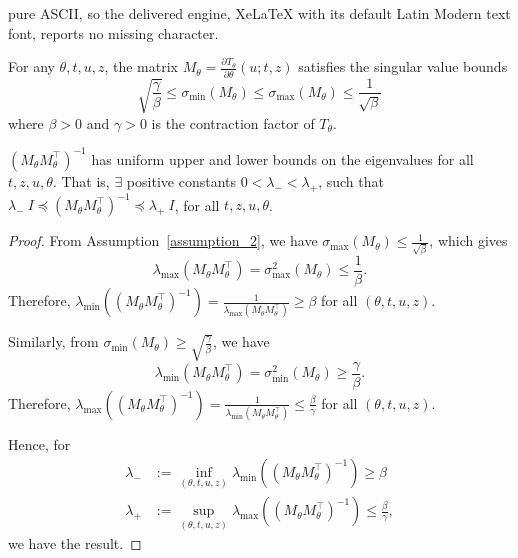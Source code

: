 \documentclass[10pt,a4paper]{amsart}
\begin{document}
pure ASCII, so the delivered engine, XeLaTeX with its default Latin Modern text font, reports no missing character.
    \begin{assumption}
For any $\theta, t, u, z$, the matrix $M_\theta = \frac{\partial T_{\theta}}{\partial \theta}(u; t, z)$ satisfies the singular value bounds
\begin{equation*}
\sqrt{\frac{\gamma}{\beta}} \leq \sigma_{\min}(M_\theta) \leq \sigma_{\max}(M_\theta) \leq \frac{1}{\sqrt{\beta}}
\end{equation*}
where $\beta > 0$ and $\gamma > 0$ is the contraction factor of $T_\theta$.
\label{assumption_2}
\end{assumption}

    \begin{lemma}
    \label{lemma: lambdaA}
    $\left( M_\theta M_\theta^\top \right)^{-1}$ has uniform upper and lower bounds on the eigenvalues for all $t,z,u,\theta$. That is, $\exists$  positive constants $0< \lambda_- < \lambda_+$, such that $\lambda_{-} \: I \preceq \left( M_\theta M_\theta^\top \right)^{-1} \preceq \lambda_+ \: I$, for all $t,z,u,\theta$.
    \end{lemma}

    \begin{proof}
        From Assumption~\ref{assumption_2}, we have $\sigma_{\max}(M_\theta) \leq \frac{1}{\sqrt{\beta}}$, which gives
        $$\lambda_{\max}(M_\theta M_\theta^\top) = \sigma_{\max}^2(M_\theta) \leq \frac{1}{\beta}.$$
        Therefore, $\lambda_{\min}((M_\theta M_\theta^\top)^{-1}) = \frac{1}{\lambda_{\max}(M_\theta M_\theta^\top)} \geq \beta$ for all $(\theta, t, u, z)$.
        
        Similarly, from $\sigma_{\min}(M_\theta) \geq \sqrt{\frac{\gamma}{\beta}}$, we have
        $$\lambda_{\min}(M_\theta M_\theta^\top) = \sigma_{\min}^2(M_\theta) \geq \frac{\gamma}{\beta}.$$
        Therefore, $\lambda_{\max}((M_\theta M_\theta^\top)^{-1}) = \frac{1}{\lambda_{\min}(M_\theta M_\theta^\top)} \leq \frac{\beta}{\gamma}$ for all $(\theta, t, u, z)$.
        
        Hence, for
        \begin{align*}
        \lambda_- &:= \inf_{(\theta, t, u, z)} \lambda_{\min}((M_\theta M_\theta^\top)^{-1}) \geq \beta \\
        \lambda_+ &:= \sup_{(\theta, t, u, z)} \lambda_{\max}((M_\theta M_\theta^\top)^{-1}) \leq \frac{\beta}{\gamma},
        \end{align*}
        we have the result.
        \end{proof}
\end{document}
